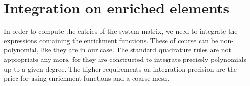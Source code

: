 \documentclass{elsarticle}
\begin{document}
% 
% 


\section{Integration on enriched elements}
\label{sec:integration}
In order to compute the entries of the system matrix, %
we need to integrate
the expressions containing the enrichment functions. These of course can be non-polynomial, like they are 
in our case. The standard quadrature rules are not appropriate any more, for they are constructed to integrate 
precisely polynomials up to a given degree. The higher requirements on integration precision
are the price for using enrichment functions and a coarse mesh.
\end{document}
